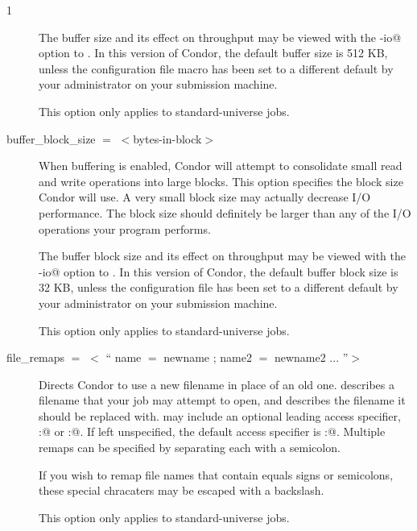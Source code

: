 \begin{ManPage}{\label{man-condor-submit}}{1}
\begin{description}
The buffer size and its effect on throughput may be viewed with
the \verb@-io@ option to . 
In this version of Condor, the default buffer size is 512 KB, unless
the configuration file macro  has
been set to a different default by your administrator on your
submission machine.

This option only applies to standard-universe jobs.


\item[buffer\_block\_size $=$ $<$bytes-in-block$>$]
When buffering is enabled, Condor will attempt to consolidate small read
and write operations into large blocks.  This option specifies the block
size Condor will use.  A very small block size may actually decrease I/O performance.
The block size should definitely be larger than any of the I/O operations
your program performs.

The buffer block size and its effect on throughput may be viewed with
the \verb@-io@ option to . 
In this version of Condor, the default buffer block size is 32 KB,
unless the configuration file 
has been set to a different default by your administrator on your
submission machine.

This option only applies to standard-universe jobs.


\item[file\_remaps $=$ $<$ `` name $=$ newname ; name2 $=$ newname2 ... ''$>$ ]
Directs Condor to use a new filename in place of an old one.  
describes a filename that your job may attempt to open, and 
describes the filename it should be replaced with.
 may include an optional leading
access specifier, \verb@local:@ or \verb@remote:@.  If left unspecified,
the default access specifier is \verb@remote:@.  Multiple remaps can be 
specified by separating each with a semicolon.

If you wish to remap file names that contain equals signs or semicolons,
these special chracaters may be escaped with a backslash.

This option only applies to standard-universe jobs.


\end{description}
\end{ManPage}
